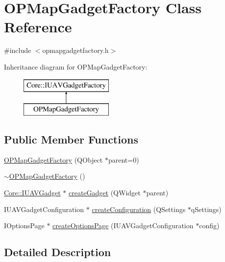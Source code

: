\hypertarget{class_o_p_map_gadget_factory}{\section{\-O\-P\-Map\-Gadget\-Factory \-Class \-Reference}
\label{class_o_p_map_gadget_factory}
}


{\ttfamily \#include $<$opmapgadgetfactory.\-h$>$}

\-Inheritance diagram for \-O\-P\-Map\-Gadget\-Factory\-:\begin{figure}[H]
\begin{center}
\leavevmode
\includegraphics[height=2.000000cm]{class_o_p_map_gadget_factory}
\end{center}
\end{figure}
\subsection*{\-Public \-Member \-Functions}
\begin{DoxyCompactItemize}
\item 
\hyperlink{group___o_p_map_plugin_ga348bc36551d757fe6accc824bda0f622}{\-O\-P\-Map\-Gadget\-Factory} (\-Q\-Object $\ast$parent=0)
\item 
\hyperlink{group___o_p_map_plugin_ga20558255cdd8731aa6edd40d797d2c02}{$\sim$\-O\-P\-Map\-Gadget\-Factory} ()
\item 
\hyperlink{class_core_1_1_i_u_a_v_gadget}{\-Core\-::\-I\-U\-A\-V\-Gadget} $\ast$ \hyperlink{group___o_p_map_plugin_ga185fdb89aa5cd90c3112f9f39333703c}{create\-Gadget} (\-Q\-Widget $\ast$parent)
\item 
\-I\-U\-A\-V\-Gadget\-Configuration $\ast$ \hyperlink{group___o_p_map_plugin_ga7f75947f3d08a110f8289998a41f44ee}{create\-Configuration} (\-Q\-Settings $\ast$q\-Settings)
\item 
\-I\-Options\-Page $\ast$ \hyperlink{group___o_p_map_plugin_gadde2c412f864fe77db6ea353a5e7071b}{create\-Options\-Page} (\-I\-U\-A\-V\-Gadget\-Configuration $\ast$config)
\end{DoxyCompactItemize}


\subsection{\-Detailed \-Description}



